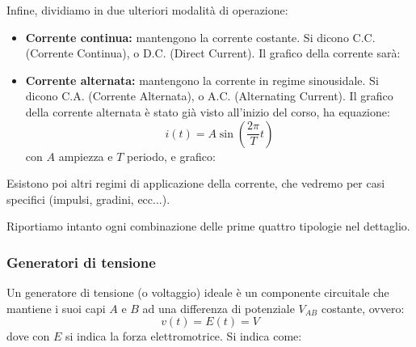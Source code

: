 \documentclass[a4paper,11pt]{article}
\begin{document}
Infine, dividiamo in due ulteriori modalità di operazione:
\begin{itemize}
	\item \textbf{Corrente continua:} mantengono la corrente costante. Si dicono C.C. (Corrente Continua), o D.C. (Direct Current). Il grafico della corrente sarà:
		\begin{center}
\end{center}

	\item \textbf{Corrente alternata:} mantengono la corrente in regime sinousidale. Si dicono C.A. (Corrente Alternata), o A.C. (Alternating Current). Il grafico della corrente alternata è stato già visto all'inizio del corso, ha equazione: 
$$
	i(t) = A \sin{\left(\frac{2\pi}{T} t \right)}
$$
con $A$ ampiezza e $T$ periodo, e grafico:

\begin{center}
\end{center}
\end{itemize}

Esistono poi altri regimi di applicazione della corrente, che vedremo per casi specifici (impulsi, gradini, ecc...).

Riportiamo intanto ogni combinazione delle prime quattro tipologie nel dettaglio.

\subsubsection{Generatori di tensione}
Un generatore di tensione (o voltaggio) ideale è un componente circuitale che mantiene i suoi capi $A$ e $B$ ad una differenza di potenziale $V_{AB}$ costante, ovvero:
$$ v(t) = E(t) = V $$
dove con $E$ si indica la forza elettromotrice. 
Si indica come:
\end{document}
